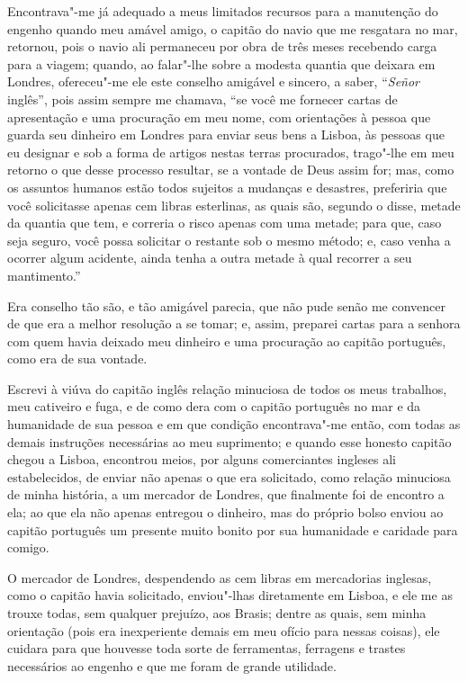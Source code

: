 Encontrava"-me já adequado a meus limitados recursos para a manutenção do
engenho quando meu amável amigo, o capitão do navio que me resgatara no
mar, retornou, pois o navio ali permaneceu por obra de três meses
recebendo carga para a viagem; quando, ao falar"-lhe sobre a modesta
quantia que deixara em Londres, ofereceu"-me ele este conselho amigável e
sincero, a saber, ``\emph{Señor} inglês'', pois assim sempre me chamava,
``se você me fornecer cartas de apresentação e uma procuração em meu
nome, com orientações à pessoa que guarda seu dinheiro em Londres para
enviar seus bens a Lisboa, às pessoas que eu designar e sob a forma de
artigos nestas terras procurados, trago"-lhe em meu retorno o que desse
processo resultar, se a vontade de Deus assim for; mas, como os assuntos
humanos estão todos sujeitos a mudanças e desastres, preferiria que você
solicitasse apenas cem libras esterlinas, as quais são, segundo o disse,
metade da quantia que tem, e correria o risco apenas com uma metade;
para que, caso seja seguro, você possa solicitar o restante sob o mesmo
método; e, caso venha a ocorrer algum acidente, ainda tenha a outra
metade à qual recorrer a seu mantimento.''

Era conselho tão são, e tão amigável parecia, que não pude senão me
convencer de que era a melhor resolução a se tomar; e, assim, preparei
cartas para a senhora com quem havia deixado meu dinheiro e uma
procuração ao capitão português, como era de sua vontade.

Escrevi à viúva do capitão inglês relação minuciosa de todos os meus
trabalhos, meu cativeiro e fuga, e de como dera com o capitão português
no mar e da humanidade de sua pessoa e em que condição encontrava"-me
então, com todas as demais instruções necessárias ao meu suprimento; e
quando esse honesto capitão chegou a Lisboa, encontrou meios, por alguns
comerciantes ingleses ali estabelecidos, de enviar não apenas o que era
solicitado, como relação minuciosa de minha história, a um mercador de
Londres, que finalmente foi de encontro a ela; ao que ela não apenas
entregou o dinheiro, mas do próprio bolso enviou ao capitão português um
presente muito bonito por sua humanidade e caridade para comigo.

O mercador de Londres, despendendo as cem libras em mercadorias
inglesas, como o capitão havia solicitado, enviou"-lhas diretamente em
Lisboa, e ele me as trouxe todas, sem qualquer prejuízo, aos Brasis;
dentre as quais, sem minha orientação (pois era inexperiente demais em
meu ofício para nessas coisas), ele cuidara para que houvesse toda sorte
de ferramentas, ferragens e trastes necessários ao engenho e que me
foram de grande utilidade.

